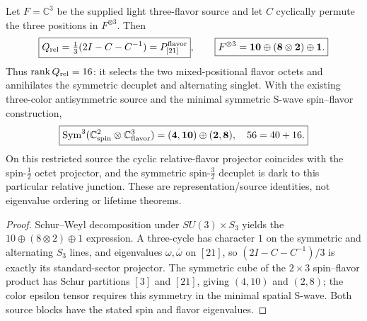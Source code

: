 \documentclass[12pt,a4paper]{article}
\begin{document}
\begin{theorem}
\label{p11:thm:v1158-three-core-ground-source}
Let $F=\mathbb C^3$ be the supplied light three-flavor source and
let $C$ cyclically permute the three positions in $F^{\otimes3}$.
Then
\[
 \boxed{Q_{\rm rel}=\tfrac13(2I-C-C^{-1})
       =P_{[21]}^{\rm flavor}},\qquad
 \boxed{F^{\otimes3}=\mathbf{10}\oplus
                   (\mathbf8\otimes\mathbf2)\oplus\mathbf1.}
\]
Thus $\operatorname{rank}Q_{\rm rel}=16$: it selects the two
mixed-positional flavor octets and annihilates the symmetric decuplet
and alternating singlet.  With the existing three-color antisymmetric
source and the minimal symmetric S-wave spin--flavor construction,
\[
 \boxed{\operatorname{Sym}^3(\mathbb C^2_{\rm spin}\otimes
          \mathbb C^3_{\rm flavor})
       =(\mathbf4,\mathbf{10})\oplus(\mathbf2,\mathbf8),
       \quad 56=40+16.}
\]
On this restricted source the cyclic relative-flavor projector
coincides with the spin-$\tfrac12$ octet projector, and the
symmetric spin-$\tfrac32$ decuplet is dark to this particular
relative junction.  These are representation/source identities,
not eigenvalue ordering or lifetime theorems.
\end{theorem}
\begin{proof}
Schur--Weyl decomposition under $SU(3)\times S_3$ yields the
$10\oplus(8\otimes2)\oplus1$ expression.  A three-cycle has
character $1$ on the symmetric and alternating $S_3$ lines,
and eigenvalues $\omega,\bar\omega$ on $[21]$, so
$(2I-C-C^{-1})/3$ is exactly its standard-sector projector.
The symmetric cube of the $2\times3$ spin--flavor product has
Schur partitions $[3]$ and $[21]$, giving $(4,10)$ and $(2,8)$;
the color epsilon tensor requires this symmetry in the minimal
spatial S-wave.  Both source blocks have the stated spin and
flavor eigenvalues.
\end{proof}
\end{document}
